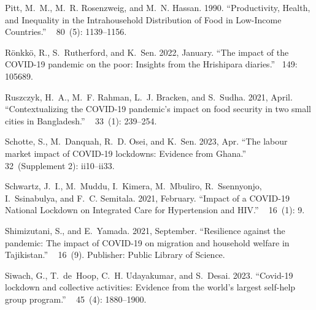 \documentclass{wber}
\begin{document}
\begin{thebibliography}{}
Pitt, M.~M., M.~R. Rosenzweig, and M.~N. Hassan. 1990.
\newblock ``{Productivity, Health, and Inequality in the Intrahousehold
  Distribution of Food in Low-Income Countries}.''
~{ 80\/}~(5): 1139--1156.

R{\"o}nkk{\"o}, R., S.~Rutherford, and K.~Sen. 2022, January.
\newblock ``The impact of the {COVID}-19 pandemic on the poor: {Insights} from
  the {Hrishipara} diaries.''
~{149}: 105689.

Ruszczyk, H.~A., M.~F. Rahman, L.~J. Bracken, and S.~Sudha. 2021, April.
\newblock ``Contextualizing the {COVID}-19 pandemic's impact on food security
  in two small cities in {Bangladesh}.''
~{ 33\/}~(1): 239--254.

Schotte, S., M.~Danquah, R.~D. Osei, and K.~Sen. 2023, Apr.
\newblock ``The labour market impact of {COVID-19} lockdowns: Evidence from
  {Ghana}.''
~{ 32\/}~(Supplement 2):
  ii10--ii33.

Schwartz, J.~I., M.~Muddu, I.~Kimera, M.~Mbuliro, R.~Ssennyonjo, I.~Ssinabulya,
  and F.~C. Semitala. 2021, February.
\newblock ``Impact of a {COVID}-19 {National} {Lockdown} on {Integrated} {Care}
  for {Hypertension} and {HIV}.''
~{ 16\/}~(1): 9.

Shimizutani, S., and E.~Yamada. 2021, September.
\newblock ``Resilience against the pandemic: {The} impact of {COVID}-19 on
  migration and household welfare in {Tajikistan}.''
~{ 16\/}~(9).
\newblock Publisher: Public Library of Science.

Siwach, G., T.~de~Hoop, C.~H. Udayakumar, and S.~Desai. 2023.
\newblock ``Covid-19 lockdown and collective activities: Evidence from the
  world's largest self-help group program.''
~{ 45\/}~(4):
  1880--1900.


\end{thebibliography}
\end{document}
